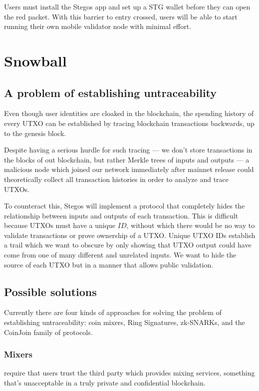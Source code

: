 \documentclass[8pt,fleqn,openany]{book}
\begin{document}
Users must install the Stegos app and set up a STG wallet before they can open the red packet. With this barrier to entry crossed, users will be able to start running their own mobile validator node with minimal effort.

\section{Snowball}
\subsection{A problem of establishing untraceability}
Even though user identities are cloaked in the blockchain, the spending history of every UTXO can be established by tracing blockchain transactions backwards, up to the genesis block.

Despite having a serious hurdle for such tracing — we don’t store transactions in the blocks of out blockchain, but rather Merkle trees of inputs and outputs — a malicious node which joined our network immediately after mainnet release could theoretically collect all transaction histories in order to analyze and trace UTXOs.

To counteract this, Stegos will implement a protocol that completely hides the relationship between inputs and outputs of each transaction. This is difficult because UTXOs must have a unique $ID$, without which there would be no way to validate transactions or prove ownership of a UTXO. Unique UTXO IDs establish a trail which we want to obscure by only showing that UTXO output could have come from one of many different and unrelated inputs. We want to hide the source of each UTXO but in a manner that allows public validation.

\subsection{Possible solutions}
Currently there are four kinds of approaches for solving the problem of establishing untraceability: coin mixers, Ring Signatures, zk-SNARKs, and the CoinJoin family of protocols.

\subsubsection{Mixers} require that users trust the third party which provides mixing services, something that’s unacceptable in a truly private and confidential blockchain.
	
\end{document}
